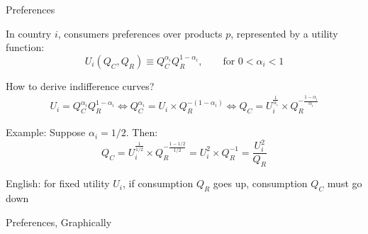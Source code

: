 \documentclass[notes,11pt, aspectratio=169, xcolor=table]{beamer}
\newenvironment{wideitemize}{\itemize\addtolength{\itemsep}{10pt}}{\enditemize}
\begin{document}
\begin{frame}{Preferences}
\begin{wideitemize}
        \item In country $i$, consumers preferences over products $p$, represented by a utility function:
        \begin{equation*}
            U_i(Q_C,Q_R) \equiv Q_C^{\alpha_i} Q_R^{1-\alpha_i}, \qquad \text{for } 0 < \alpha_i < 1   
        \end{equation*}
        \item How to derive indifference curves?
        \begin{eqnarray*}
            U_i = Q_C^{\alpha_i} Q_R^{1-\alpha_i} \iff Q_C^{\alpha_i} = U_i \times Q_R^{-(1-\alpha_i)} \iff Q_C = U_i^{\frac{1}{\alpha_i}} \times Q_R^{-\frac{1-\alpha_i}{\alpha_i}} 
        \end{eqnarray*}
        \item<2-> Example: Suppose $\alpha_i=1/2$. Then:
        \begin{equation*}
            Q_C = U_i^{\frac{1}{1/2}} \times Q_R^{-\frac{1-1/2}{1/2}} = U_i^{2} \times Q_R^{-1} = \frac{U_i^{2}}{Q_R} 
        \end{equation*}
        \item<3-> English: for fixed utility $U_i$, if consumption $Q_R$ goes up, consumption $Q_C$ must go down
    \end{wideitemize}
\end{frame}



\begin{frame}{Preferences, Graphically}

\begin{figure}[htbp]


\end{figure}

\end{frame}
\end{document}
